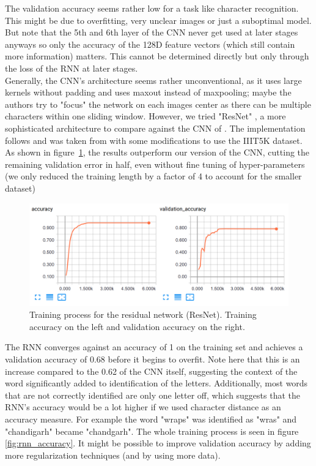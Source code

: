 \documentclass{utue} %
\begin{document}
The validation accuracy seems rather low for a task like character recognition. This might be due to overfitting, very unclear images or just a suboptimal model. But note that the 5th and 6th layer of the CNN never get used at later stages anyways so only the accuracy of the 128D feature vectors (which still contain more information) matters. This cannot be determined directly but only through the loss of the RNN at later stages. \\
Generally, the CNN's architecture seems rather unconventional, as it uses large kernels without padding and uses maxout instead of maxpooling; maybe the authors try to "focus" the network on each images center as there can be multiple characters within one sliding window. However, we tried "ResNet" \cite{resnet1}, a more sophisticated architecture to compare against the CNN of \cite{2015arXiv150604395H}. The implementation follows \cite{resnet2} and was taken from \cite{tensorpack} with some modifications to use the IIIT5K dataset. As shown in figure~\ref{fig:resnet}, the results outperform our version of the CNN, cutting the remaining validation error in half, even without fine tuning of hyper-parameters (we only reduced the training length by a factor of 4 to account for the smaller dataset)
\begin{figure}[h!]
	\centering
	\includegraphics[width=\columnwidth]{graphics/resnet_accuracy.png}
	\caption{\label{fig:resnet}Training process for the residual network (ResNet). Training accuracy on the left and validation accuracy on the right.}
\end{figure}

The RNN converges against an accuracy of 1 on the training set and achieves a validation accuracy of $0.68$ before it begins to overfit. Note here that this is an increase compared to the 0.62 of the CNN itself, suggesting the context of the word significantly added to identification of the letters. Additionally, most words that are not correctly identified are only one letter off, which suggests that the RNN's accuracy would be a lot higher if we used character distance as an accuracy measure. For example the word "wraps" was identified as "wras" and "chandigarh" became "chandgarh".%
The whole training process is seen in figure \ref{fig:rnn_accuracy}. It might be possible to improve validation accuracy by adding more regularization techniques (and by using more data).
\end{document}
